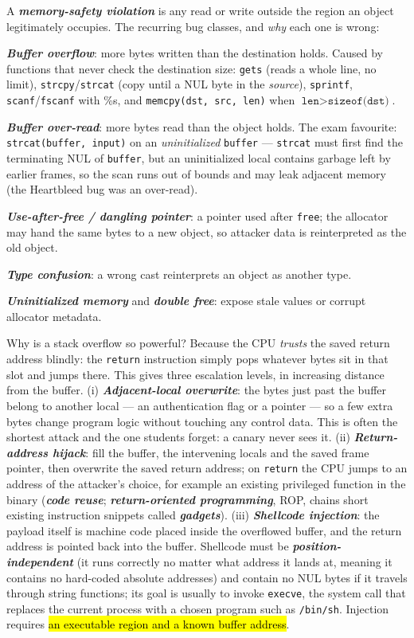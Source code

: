 \documentclass[12pt, a4paper]{article}
\newcommand{\term}[1]{\textbf{\textit{#1}}}        %
\newcommand{\imp}[1]{\hl{#1}}                       %
\begin{document}
A \term{memory-safety violation} is any read or write outside the region an object legitimately occupies. The recurring bug classes, and \emph{why} each one is wrong: \begin{tightitem} \item \term{Buffer overflow}: more bytes written than the destination holds. Caused by functions that never check the destination size: \texttt{gets} (reads a whole line, no limit), \texttt{strcpy}/\texttt{strcat} (copy until a NUL byte in the \emph{source}), \texttt{sprintf}, \texttt{scanf}/\texttt{fscanf} with \%s, and \texttt{memcpy(dst, src, len)} when $\texttt{len} > \texttt{sizeof(dst)}$. \item \term{Buffer over-read}: more bytes read than the object holds. The exam favourite: \texttt{strcat(buffer, input)} on an \emph{uninitialized} \texttt{buffer} --- \texttt{strcat} must first find the terminating NUL of \texttt{buffer}, but an uninitialized local contains garbage left by earlier frames, so the scan runs out of bounds and may leak adjacent memory (the Heartbleed bug was an over-read). \item \term{Use-after-free / dangling pointer}: a pointer used after \texttt{free}; the allocator may hand the same bytes to a new object, so attacker data is reinterpreted as the old object. \item \term{Type confusion}: a wrong cast reinterprets an object as another type. \item \term{Uninitialized memory} and \term{double free}: expose stale values or corrupt allocator metadata. \end{tightitem}

Why is a stack overflow so powerful? Because the CPU \emph{trusts} the saved return address blindly: the \texttt{return} instruction simply pops whatever bytes sit in that slot and jumps there. This gives three escalation levels, in increasing distance from the buffer. (i) \term{Adjacent-local overwrite}: the bytes just past the buffer belong to another local --- an authentication flag or a pointer --- so a few extra bytes change program logic without touching any control data. This is often the shortest attack and the one students forget: a canary never sees it. (ii) \term{Return-address hijack}: fill the buffer, the intervening locals and the saved frame pointer, then overwrite the saved return address; on \texttt{return} the CPU jumps to an address of the attacker's choice, for example an existing privileged function in the binary (\term{code reuse}; \term{return-oriented programming}, ROP, chains short existing instruction snippets called \term{gadgets}). (iii) \term{Shellcode injection}: the payload itself is machine code placed inside the overflowed buffer, and the return address is pointed back into the buffer. Shellcode must be \term{position-independent} (it runs correctly no matter what address it lands at, meaning it contains no hard-coded absolute addresses) and contain no NUL bytes if it travels through string functions; its goal is usually to invoke \texttt{execve}, the system call that replaces the current process with a chosen program such as \texttt{/bin/sh}. Injection requires \imp{an executable region and a known buffer address}.
\end{document}
